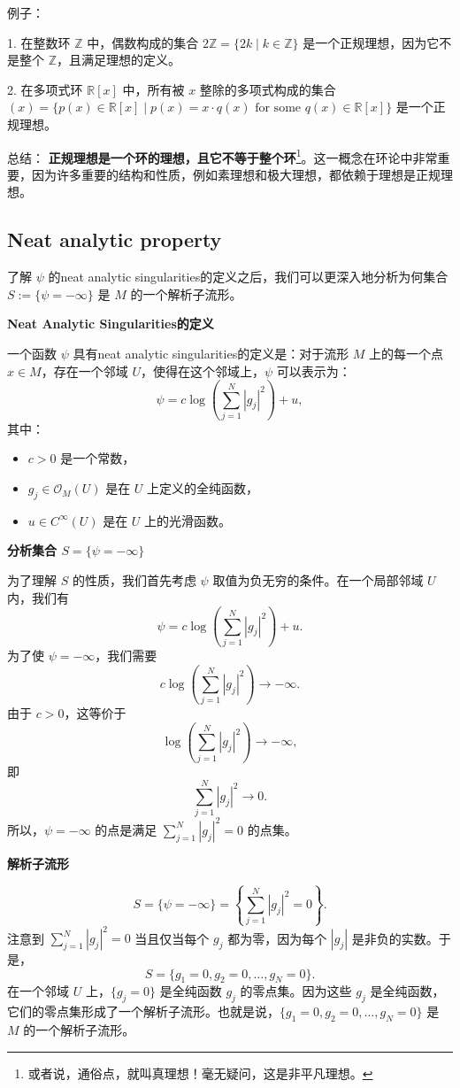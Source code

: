 \documentclass[lang=cn,12pt,fontset=none,a4paper]{beautybook}
\begin{document}
例子：

1. 在整数环 $\mathbb{Z}$ 中，偶数构成的集合 $2\mathbb{Z} = \{2k \mid k \in \mathbb{Z}\}$ 是一个正规理想，因为它不是整个 $\mathbb{Z}$，且满足理想的定义。

2. 在多项式环 $\mathbb{R}[x]$ 中，所有被 $x$ 整除的多项式构成的集合 $(x) = \{ p(x) \in \mathbb{R}[x] \mid p(x) = x \cdot q(x) \text{ for some } q(x) \in \mathbb{R}[x] \}$ 是一个正规理想。

总结：
\textbf{正规理想是一个环的理想，且它不等于整个环}\footnote{或者说，通俗点，就叫真理想！毫无疑问，这是非平凡理想。}。这一概念在环论中非常重要，因为许多重要的结构和性质，例如素理想和极大理想，都依赖于理想是正规理想。


\subsection{Neat analytic property}

了解 \(\psi\) 的neat analytic singularities的定义之后，我们可以更深入地分析为何集合 \( S := \{ \psi = -\infty \} \) 是 \( M \) 的一个解析子流形。

\textbf{Neat Analytic Singularities的定义}

一个函数 \(\psi\) 具有neat analytic singularities的定义是：对于流形 \(M\) 上的每一个点 \(x \in M\)，存在一个邻域 \(U\)，使得在这个邻域上，\(\psi\) 可以表示为：
\[
\psi = c \log \left( \sum_{j=1}^N |g_j|^2 \right) + u,
\]
其中：
\begin{itemize}
  \item \(c > 0\) 是一个常数，
  \item \(g_j \in \mathcal{O}_M(U)\) 是在 \(U\) 上定义的全纯函数，
  \item \(u \in C^\infty(U)\) 是在 \(U\) 上的光滑函数。
\end{itemize}

\textbf{分析集合 \( S = \{ \psi = -\infty \} \)}

为了理解 \( S \) 的性质，我们首先考虑 \(\psi\) 取值为负无穷的条件。在一个局部邻域 \(U\) 内，我们有
\[
\psi = c \log \left( \sum_{j=1}^N |g_j|^2 \right) + u.
\]
为了使 \(\psi = -\infty\)，我们需要
\[
c \log \left( \sum_{j=1}^N |g_j|^2 \right) \to -\infty.
\]
由于 \(c > 0\)，这等价于
\[
\log \left( \sum_{j=1}^N |g_j|^2 \right) \to -\infty,
\]
即
\[
\sum_{j=1}^N |g_j|^2 \to 0.
\]
所以，\(\psi = -\infty\) 的点是满足 \( \sum_{j=1}^N |g_j|^2 = 0 \) 的点集。

\textbf{解析子流形}

\[
S = \{ \psi = -\infty \} = \left\{ \sum_{j=1}^N |g_j|^2 = 0 \right\}.
\]
注意到 \(\sum_{j=1}^N |g_j|^2 = 0\) 当且仅当每个 \(g_j\) 都为零，因为每个 \(|g_j|\) 是非负的实数。于是，
\[
S = \{ g_1 = 0, g_2 = 0, \ldots, g_N = 0 \}.
\]
在一个邻域 \(U\) 上，\(\{g_j = 0\}\) 是全纯函数 \(g_j\) 的零点集。因为这些 \(g_j\) 是全纯函数，它们的零点集形成了一个解析子流形。也就是说，\(\{g_1 = 0, g_2 = 0, \ldots, g_N = 0\}\) 是 \(M\) 的一个解析子流形。
\end{document}
